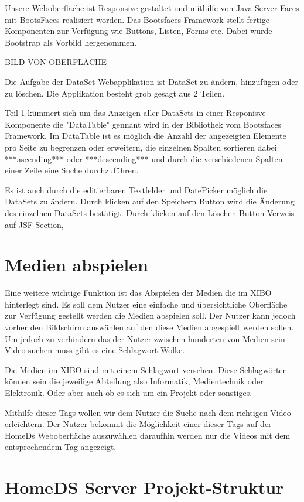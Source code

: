 Unsere Weboberfläche ist Responsive gestaltet und mithilfe von Java Server Faces mit BootsFaces realisiert worden. Das Bootsfaces Framework stellt fertige Komponenten zur Verfügung wie Buttons, Listen, Forms etc. Dabei wurde Bootstrap als Vorbild hergenommen.

BILD VON OBERFLÄCHE

Die Aufgabe der DataSet Webapplikation ist DataSet zu ändern, hinzufügen oder zu löschen. Die Applikation besteht grob gesagt aus 2 Teilen. 

Teil 1 kümmert sich um das Anzeigen aller DataSets in einer Responisve Komponente die "DataTable" gennant wird in der Bibliothek vom Bootsfaces Framework. Im DataTable ist es möglich die Anzahl der angezeigten Elemente pro Seite zu begrenzen oder erweitern,  die einzelnen Spalten sortieren dabei ***ascending*** oder ***descending*** und durch die verschiedenen Spalten einer Zeile eine Suche durchzuführen. 

Es ist auch durch die editierbaren Textfelder und DatePicker möglich die DataSets zu ändern. Durch klicken auf den Speichern Button wird die Änderung des einzelnen DataSets bestätigt. Durch klicken auf den Löschen Button
Verweis auf JSF Section,


\section{Medien abspielen}\label{sec:playmedia}
Eine weitere wichtige Funktion ist das Abspielen der Medien die im XIBO hinterlegt sind. Es soll dem Nutzer eine einfache und übersichtliche Oberfläche zur Verfügung gestellt werden die Medien abspielen soll. Der Nutzer kann jedoch vorher den Bildschirm auswählen auf den diese Medien abgespielt werden sollen. Um jedoch zu verhindern das der Nutzer zwischen hunderten von Medien sein Video suchen muss gibt es eine Schlagwort Wolke.

Die Medien im XIBO sind mit einem Schlagwort versehen. Diese Schlagwörter können sein die jeweilige Abteilung also Informatik, Medientechnik oder Elektronik. Oder aber auch ob es sich um ein Projekt oder sonstiges. 

Mithilfe dieser Tags wollen wir dem Nutzer die Suche nach dem richtigen Video erleichtern. Der Nutzer bekommt die Möglichkeit einer dieser Tags auf der HomeDs Weboberfläche auszuwählen daraufhin werden nur die Videos mit dem entsprechendem Tag angezeigt.


\section{HomeDS Server Projekt-Struktur}\label{sec:javaeestruktur}


